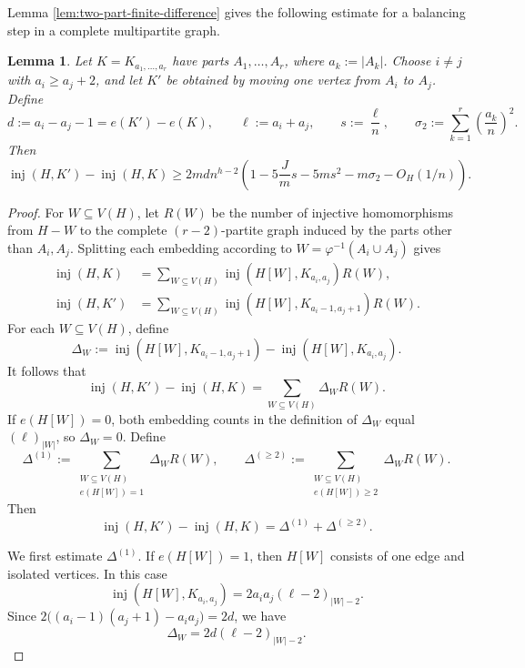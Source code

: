 \documentclass[11pt]{article}
\numberwithin{equation}{section}
\newtheorem{lemma}[theorem]{Lemma}
\theoremstyle{definition}
\theoremstyle{remark}
\newcommand{\inj}{\operatorname{inj}}
\begin{document}
Lemma \ref{lem:two-part-finite-difference} gives the following estimate for a balancing step in a complete multipartite graph.

\begin{lemma}
\label{lem:balancing}
Let $K=K_{a_1,\ldots,a_r}$ have parts $A_1,\ldots,A_r$, where $a_k:=|A_k|$. Choose $i\ne j$ with $a_i\ge a_j+2$, and let $K'$ be obtained by moving one vertex from $A_i$ to $A_j$. Define
\[
d:=a_i-a_j-1=e(K')-e(K),\qquad
\ell:=a_i+a_j,\qquad
s:=\frac{\ell}{n},\qquad
\sigma_2:=\sum_{k=1}^r\left(\frac{a_k}{n}\right)^2.
\]
Then
\[
\inj(H,K')-\inj(H,K)
\ge 2mdn^{h-2}\left(1-5\frac{J}{m}s-5ms^2-m\sigma_2-O_H(1/n)\right).
\]
\end{lemma}

\begin{proof}
For $W\subseteq V(H)$, let $R(W)$ be the number of injective homomorphisms from $H-W$ to the complete $(r-2)$-partite graph induced by the parts other than $A_i,A_j$. Splitting each embedding according to $W=\varphi^{-1}(A_i\cup A_j)$ gives
\begin{align*}
\inj(H,K)
&=\sum_{W\subseteq V(H)}\inj(H[W],K_{a_i,a_j})R(W),\\
\inj(H,K')
&=\sum_{W\subseteq V(H)}\inj(H[W],K_{a_i-1,a_j+1})R(W).
\end{align*}
For each $W\subseteq V(H)$, define
\[
\Delta_W:=\inj(H[W],K_{a_i-1,a_j+1})-\inj(H[W],K_{a_i,a_j}).
\]
It follows that
\[
\inj(H,K')-\inj(H,K)=\sum_{W\subseteq V(H)}\Delta_WR(W).
\]
If $e(H[W])=0$, both embedding counts in the definition of $\Delta_W$ equal $(\ell)_{|W|}$, so $\Delta_W=0$. Define
\[
\Delta^{(1)}
:=\sum_{\substack{W\subseteq V(H)\\e(H[W])=1}}\Delta_WR(W),
\qquad
\Delta^{(\ge2)}
:=\sum_{\substack{W\subseteq V(H)\\e(H[W])\ge2}}\Delta_WR(W).
\]
Then
\[
\inj(H,K')-\inj(H,K)=\Delta^{(1)}+\Delta^{(\ge2)}.
\]

We first estimate $\Delta^{(1)}$. If $e(H[W])=1$, then $H[W]$ consists of one edge and isolated vertices. In this case
\[
\inj(H[W],K_{a_i,a_j})
=2a_ia_j(\ell-2)_{|W|-2}.
\]
Since $2\bigl((a_i-1)(a_j+1)-a_ia_j\bigr)=2d$, we have
\begin{equation}
\label{eq:one-edge-delta}
\Delta_W=2d(\ell-2)_{|W|-2}.
\end{equation}


\end{proof}
\end{document}
